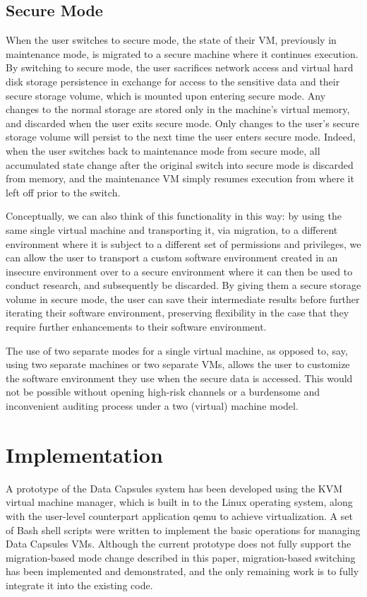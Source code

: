 \documentclass{acm_proc_article-sp}
\begin{document}
\subsection{Secure Mode}

When the user switches to secure mode, the state of their VM, previously in
maintenance mode, is migrated to a secure machine where it continues execution.
By switching to secure mode, the user sacrifices network access and virtual hard
disk storage persistence in exchange for access to the sensitive data and their
secure storage volume, which is mounted upon entering secure mode.  Any changes
to the normal storage are stored only in the machine's virtual memory, and
discarded when the user exits secure mode.  Only changes to the user's secure
storage volume will persist to the next time the user enters secure mode.
Indeed, when the user switches back to maintenance mode from secure mode, all
accumulated state change after the original switch into secure mode is discarded
from memory, and the maintenance VM simply resumes execution from where it left
off prior to the switch.

Conceptually, we can also think of this functionality in this way: by using the
same single virtual machine and transporting it, via migration, to a different
environment where it is subject to a different set of permissions and
privileges, we can allow the user to transport a custom software environment
created in an insecure environment over to a secure environment where it can
then be used to conduct research, and subsequently be discarded.  By giving them
a secure storage volume in secure mode, the user can save their intermediate
results before further iterating their software environment, preserving
flexibility in the case that they require further enhancements to their
software environment.

The use of two separate modes for a single virtual machine, as opposed to, say,
using two separate machines or two separate VMs, allows the user to customize
the software environment they use when the secure data is accessed.  This would
not be possible without opening high-risk channels or a burdensome and
inconvenient auditing process under a two (virtual) machine model.

\section{Implementation}

A prototype of the Data Capsules system has been developed using the KVM virtual
machine manager, which is built in to the Linux operating system, along with the
user-level counterpart application qemu to achieve virtualization.  A set of
Bash shell scripts were written to implement the basic operations for managing
Data Capsules VMs.  Although the current prototype does not fully support the
migration-based mode change described in this paper, migration-based switching
has been implemented and demonstrated, and the only remaining work is to fully
integrate it into the existing code.
\end{document}
